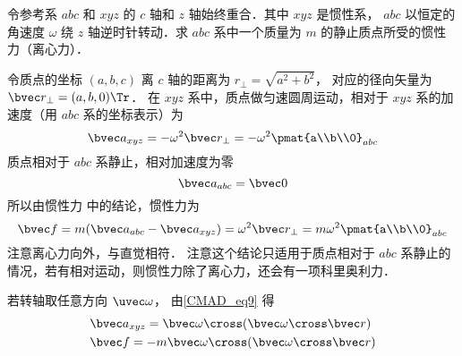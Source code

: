 
令参考系 $abc$ 和 $xyz$ 的 $c$ 轴和 $z$ 轴始终重合．其中 $xyz$ 是惯性系， $abc$ 以恒定的角速度 $\omega$ 绕 $z$ 轴逆时针转动．求 $abc$ 系中一个质量为 $m$ 的静止质点所受的惯性力（离心力）．

令质点的坐标 $(a,b,c)$ 离 $c$ 轴的距离为 $r_\bot = \sqrt{a^2 + b^2}$， 对应的径向矢量为 $\bvec r_\bot = (a,b,0)\Tr$． 在 $xyz$ 系中，质点做匀速圆周运动，相对于 $xyz$ 系的加速度（用 $abc$ 系的坐标表示）为
\begin{equation}
\bvec a_{xyz} =  - \omega ^2 \bvec r_\bot =  - \omega ^2 \pmat{a\\b\\0}_{abc}
\end{equation}
质点相对于 $abc$ 系静止，相对加速度为零
\begin{equation}
\bvec a_{abc} = \bvec 0
\end{equation}
所以由惯性力 中的结论，惯性力为
\begin{equation}\label{Centri_eq3}
\bvec f = m(\bvec a_{abc} - \bvec a_{xyz}) = \omega^2\bvec r_\bot = m\omega ^2\pmat{a\\b\\0}_{abc}
\end{equation}
注意离心力向外，与直觉相符． 注意这个结论只适用于质点相对于 $abc$ 系静止的情况，若有相对运动，则惯性力除了离心力，还会有一项科里奥利力．

若转轴取任意方向 $\uvec\omega$， 由\autoref{CMAD_eq9} 得
\begin{align}
&\bvec a_{xyz} = \bvec\omega\cross (\bvec\omega\cross\bvec r)\\
&\bvec f = -m\bvec\omega\cross (\bvec\omega\cross\bvec r)\label{Centri_eq5}
\end{align}